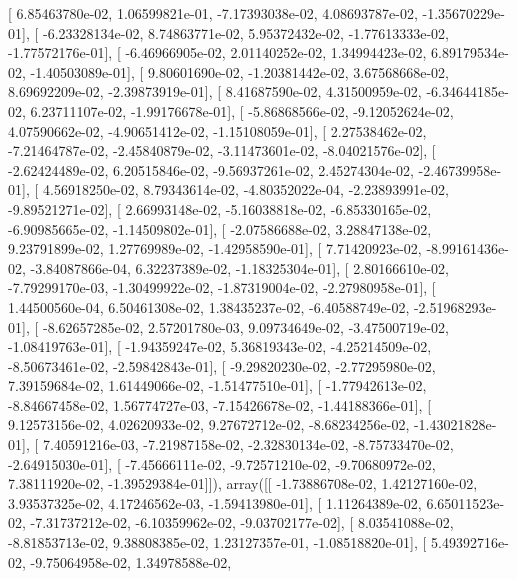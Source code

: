 \documentclass{article}
\begin{document}
       [  6.85463780e-02,   1.06599821e-01,  -7.17393038e-02,
          4.08693787e-02,  -1.35670229e-01],
       [ -6.23328134e-02,   8.74863771e-02,   5.95372432e-02,
         -1.77613333e-02,  -1.77572176e-01],
       [ -6.46966905e-02,   2.01140252e-02,   1.34994423e-02,
          6.89179534e-02,  -1.40503089e-01],
       [  9.80601690e-02,  -1.20381442e-02,   3.67568668e-02,
          8.69692209e-02,  -2.39873919e-01],
       [  8.41687590e-02,   4.31500959e-02,  -6.34644185e-02,
          6.23711107e-02,  -1.99176678e-01],
       [ -5.86868566e-02,  -9.12052624e-02,   4.07590662e-02,
         -4.90651412e-02,  -1.15108059e-01],
       [  2.27538462e-02,  -7.21464787e-02,  -2.45840879e-02,
         -3.11473601e-02,  -8.04021576e-02],
       [ -2.62424489e-02,   6.20515846e-02,  -9.56937261e-02,
          2.45274304e-02,  -2.46739958e-01],
       [  4.56918250e-02,   8.79343614e-02,  -4.80352022e-04,
         -2.23893991e-02,  -9.89521271e-02],
       [  2.66993148e-02,  -5.16038818e-02,  -6.85330165e-02,
         -6.90985665e-02,  -1.14509802e-01],
       [ -2.07586688e-02,   3.28847138e-02,   9.23791899e-02,
          1.27769989e-02,  -1.42958590e-01],
       [  7.71420923e-02,  -8.99161436e-02,  -3.84087866e-04,
          6.32237389e-02,  -1.18325304e-01],
       [  2.80166610e-02,  -7.79299170e-03,  -1.30499922e-02,
         -1.87319004e-02,  -2.27980958e-01],
       [  1.44500560e-04,   6.50461308e-02,   1.38435237e-02,
         -6.40588749e-02,  -2.51968293e-01],
       [ -8.62657285e-02,   2.57201780e-03,   9.09734649e-02,
         -3.47500719e-02,  -1.08419763e-01],
       [ -1.94359247e-02,   5.36819343e-02,  -4.25214509e-02,
         -8.50673461e-02,  -2.59842843e-01],
       [ -9.29820230e-02,  -2.77295980e-02,   7.39159684e-02,
          1.61449066e-02,  -1.51477510e-01],
       [ -1.77942613e-02,  -8.84667458e-02,   1.56774727e-03,
         -7.15426678e-02,  -1.44188366e-01],
       [  9.12573156e-02,   4.02620933e-02,   9.27672712e-02,
         -8.68234256e-02,  -1.43021828e-01],
       [  7.40591216e-03,  -7.21987158e-02,  -2.32830134e-02,
         -8.75733470e-02,  -2.64915030e-01],
       [ -7.45666111e-02,  -9.72571210e-02,  -9.70680972e-02,
          7.38111920e-02,  -1.39529384e-01]]), array([[ -1.73886708e-02,   1.42127160e-02,   3.93537325e-02,
          4.17246562e-03,  -1.59413980e-01],
       [  1.11264389e-02,   6.65011523e-02,  -7.31737212e-02,
         -6.10359962e-02,  -9.03702177e-02],
       [  8.03541088e-02,  -8.81853713e-02,   9.38808385e-02,
          1.23127357e-01,  -1.08518820e-01],
       [  5.49392716e-02,  -9.75064958e-02,   1.34978588e-02,
\end{document}
